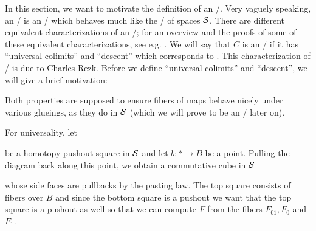 In this section, we want to motivate the definition of an \inftytop/.
Very vaguely speaking, an \inftytop/ is an \inftycat/ which behaves much like the \inftycat/ of spaces $\mathcal{S}$.
There are different equivalent characterizations of an \inftytop/; for an overview and the proofs of some of these equivalent characterizations, see e.g. %
.
We will say that $C$ is an \inftytop/ if it has ``universal colimits'' and ``descent'' which corresponds to %
.
This characterization of \inftytops/ is due to Charles Rezk.
Before we define ``universal colimits'' and ``descent'', we will give a brief motivation:

Both properties are supposed to ensure fibers of maps behave nicely under various glueings, as they do in $\mathcal{S}$ (which we will prove to be an \inftytop/ later on).

For universality, let 
\begin{center}
\end{center}
be a homotopy pushout square in $\mathcal{S}$ and let $b\colon*\to B$ be a point.
Pulling the diagram back along this point, we obtain a commutative cube in $\mathcal{S}$
\begin{center}
\end{center}
whose side faces are pullbacks by the pasting law.
The top square consists of fibers over $B$ and since the bottom square is a pushout we want that the top square is a pushout as well so that we can compute $F$ from the fibers $F_{01},F_0$ and $F_1$. 

